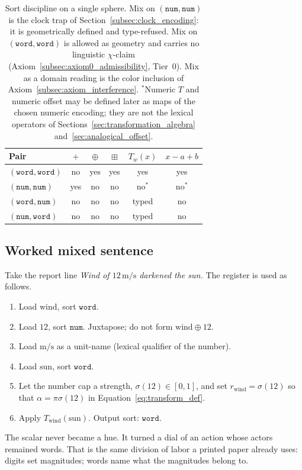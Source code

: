 \documentclass[12pt, a4paper]{article}
\begin{document}
\begin{table}[h]
\centering
\begin{tabular}{lccccc}
\hline
Pair & $+$ & $\oplus$ & $\boxplus$ & $T_w(x)$ & $x-a+b$ \\
\hline
$(\mathtt{word},\mathtt{word})$ & no & yes & yes & yes & yes \\
$(\mathtt{num},\mathtt{num})$   & yes & no  & no  & no$^{*}$ & no$^{*}$ \\
$(\mathtt{word},\mathtt{num})$  & no & no  & no  & typed & no \\
$(\mathtt{num},\mathtt{word})$  & no & no  & no  & typed & no \\
\hline
\end{tabular}
\caption{Sort discipline on a single sphere.
Mix on $(\mathtt{num},\mathtt{num})$ is the clock trap of
Section~\ref{subsec:clock_encoding}: it is geometrically defined and
type-refused. Mix on $(\mathtt{word},\mathtt{word})$ is allowed as
geometry and carries no linguistic $\chi$-claim
(Axiom~\ref{subsec:axiom0_admissibility}, Tier~0). Mix as a domain
reading is the color inclusion of
Axiom~\ref{subsec:axiom_interference}.
$^{*}$Numeric $T$ and numeric offset may be defined later as
maps of the chosen numeric encoding; they are not the lexical
operators of Sections~\ref{sec:transformation_algebra}
and~\ref{sec:analogical_offset}.}
\label{tab:type_table}
\end{table}

\subsection{Worked mixed sentence}
\label{subsec:mixed_sentence}
Take the report line \emph{Wind of $12\,\mathrm{m/s}$ darkened the sun.}
The register is used as follows.

\begin{enumerate}
    \item Load $\mathrm{wind}$, sort $\mathtt{word}$.
    \item Load $12$, sort $\mathtt{num}$. Juxtapose; do not form
          $\mathrm{wind}\oplus 12$.
    \item Load $\mathrm{m/s}$ as a unit-name (lexical qualifier of the
          number).
    \item Load $\mathrm{sun}$, sort $\mathtt{word}$.
    \item Let the number cap a strength,
          $\sigma(12)\in[0,1]$, and set
          $r_{\mathrm{wind}}=\sigma(12)$ so that
          $\alpha=\pi\sigma(12)$ in Equation~\eqref{eq:transform_def}.
    \item Apply $T_{\mathrm{wind}}(\mathrm{sun})$. Output sort:
          $\mathtt{word}$.
\end{enumerate}
The scalar never became a hue. It turned a dial of an action whose
actors remained words. That is the same division of labor a printed
paper already uses: digits set magnitudes; words name what the
magnitudes belong to.
\end{document}
